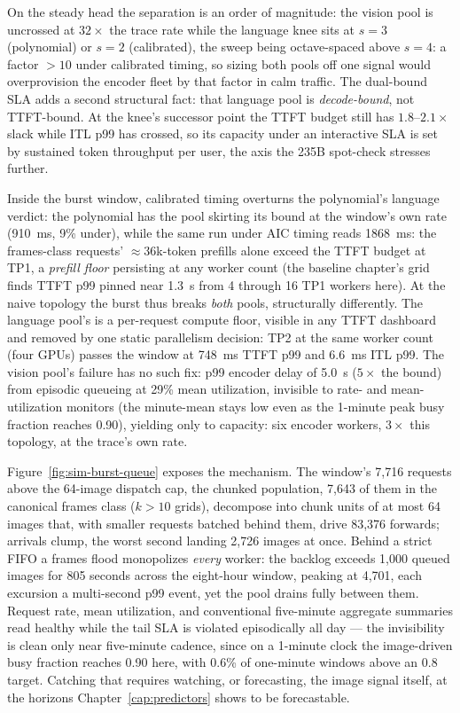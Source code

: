 On the steady head the separation is an order of magnitude: the vision pool
is uncrossed at $32\times$ the trace rate while the language knee sits at
$s{=}3$ (polynomial) or $s{=}2$ (calibrated), the sweep being
octave-spaced above $s{=}4$: a factor ${>}10$ under calibrated timing, so
sizing both pools off one signal would overprovision the encoder fleet by
that factor in calm traffic. The dual-bound SLA adds a second structural
fact: that language pool is \emph{decode-bound}, not TTFT-bound. At the
knee's successor point the TTFT budget still has $1.8$--$2.1\times$ slack
while ITL p99 has crossed, so its capacity under an interactive SLA is
set by sustained token throughput per user, the axis the 235B spot-check
stresses further.

Inside the burst window, calibrated timing overturns the polynomial's
language verdict: the polynomial has the pool skirting its bound at the
window's own rate (\SI{910}{\milli\second}, 9\% under), while the same run
under AIC timing reads \SI{1868}{\milli\second}: the frames-class
requests' ${\approx}36$k-token prefills alone exceed the TTFT budget at TP1,
a \emph{prefill floor} persisting at any worker count (the baseline
chapter's grid finds TTFT p99 pinned near \SI{1.3}{\second} from 4 through
16 TP1 workers here). At the naive topology the burst thus breaks \emph{both}
pools, structurally differently. The language pool's is a per-request
compute floor, visible in any TTFT dashboard and removed by one static
parallelism decision: TP2 at the same worker count (four GPUs) passes the
window at \SI{748}{\milli\second} TTFT p99 and \SI{6.6}{\milli\second} ITL
p99. The vision pool's failure has no such fix: p99 encoder delay of
\SI{5.0}{\second} ($5\times$ the bound) from episodic queueing at 29\% mean
utilization, invisible to rate- and mean-utilization monitors (the
minute-mean stays low even as the 1-minute peak busy fraction reaches 0.90),
yielding only to capacity: six encoder workers, $3\times$ this topology,
at the trace's own rate.

Figure~\ref{fig:sim-burst-queue} exposes the mechanism. The window's
7{,}716 requests above the 64-image dispatch cap, the chunked population,
7{,}643 of them in the canonical frames class ($k{>}10$ grids), decompose
into chunk units of at most 64 images that, with smaller requests batched
behind them, drive 83{,}376 forwards; arrivals clump, the worst second
landing 2{,}726 images at once. Behind a strict FIFO a frames flood
monopolizes \emph{every} worker: the backlog exceeds 1{,}000 queued images
for 805 seconds across the eight-hour window, peaking at 4{,}701, each
excursion a multi-second p99 event, yet the pool drains fully between them.
Request rate, mean utilization, and conventional five-minute aggregate
summaries read healthy while the tail SLA is violated episodically all day
--- the invisibility is clean only near five-minute cadence, since on a
1-minute clock the image-driven busy fraction reaches 0.90 here, with 0.6\%
of one-minute windows above an 0.8 target. Catching that
requires watching, or forecasting, the image signal itself, at the
horizons Chapter~\ref{cap:predictors} shows to be forecastable.

